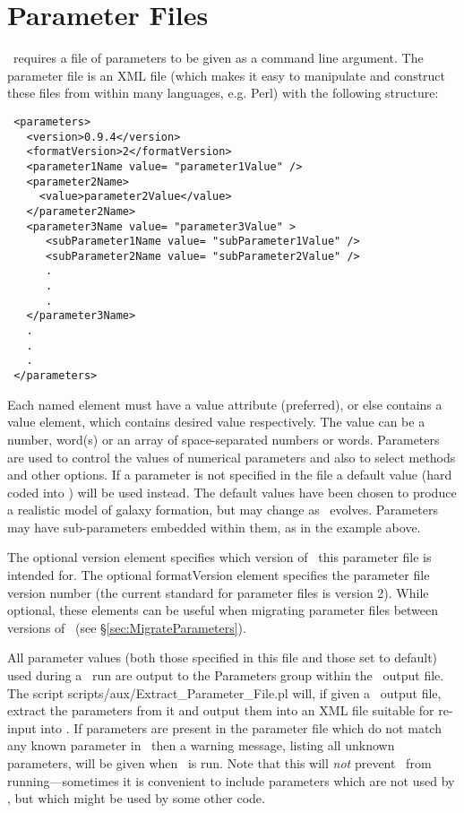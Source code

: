 \section{Parameter Files}

\glc\ requires a file of parameters to be given as a command line argument. The parameter file is an XML file (which makes it easy to manipulate and construct these files from within many languages, e.g. Perl) with the following structure:
\begin{verbatim}
 <parameters>
   <version>0.9.4</version>
   <formatVersion>2</formatVersion>
   <parameter1Name value= "parameter1Value" />
   <parameter2Name>
     <value>parameter2Value</value>
   </parameter2Name>
   <parameter3Name value= "parameter3Value" >
      <subParameter1Name value= "subParameter1Value" />
      <subParameter2Name value= "subParameter2Value" />
      .
      .
      .
   </parameter3Name>
   .
   .
   .
 </parameters>
\end{verbatim}
Each named element must have a {\normalfont \ttfamily value} attribute (preferred), or else contains a value element, which contains desired value respectively. The value can be a number, word(s) or an array of space-separated numbers or words. Parameters are used to control the values of numerical parameters and also to select methods and other options. If a parameter is not specified in the file a default value (hard coded into \glc) will be used instead. The default values have been chosen to produce a realistic model of galaxy formation, but may change as \glc\ evolves. Parameters may have sub-parameters embedded within them, as in the example above.

The optional {\normalfont \ttfamily version} element specifies which version of \glc\ this parameter file is intended for. The optional {\normalfont \ttfamily formatVersion} element specifies the parameter file version number (the current standard for parameter files is version 2). While optional, these elements can be useful when migrating parameter files between versions of \glc\ (see \S\ref{sec:MigrateParameters}).

All parameter values (both those specified in this file and those set to default) used during a \glc\ run are output to the {\normalfont \ttfamily Parameters} group within the \glc\ output file. The script {\normalfont \ttfamily scripts/aux/Extract\_Parameter\_File.pl} will, if given a \glc\ output file, extract the parameters from it and output them into an XML file suitable for re-input into \glc. If parameters are present in the parameter file which do not match any known parameter in \glc\ then a warning message, listing all unknown parameters, will be given when \glc\ is run. Note that this will \emph{not} prevent \glc\ from running---sometimes it is convenient to include parameters which are not used by \glc, but which might be used by some other code.

